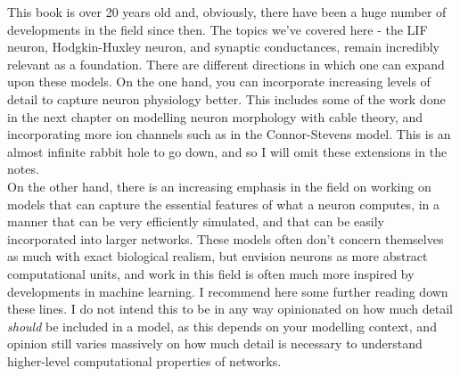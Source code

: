 \documentclass{article}
\begin{document}
This book is over 20 years old and, obviously, there have been a huge number of developments in the field since then. The topics we've covered here - the LIF neuron, Hodgkin-Huxley neuron, and synaptic conductances, remain incredibly relevant as a foundation. There are different directions in which one can expand upon these models. On the one hand, you can incorporate increasing levels of detail to capture neuron physiology better. This includes some of the work done in the next chapter on modelling neuron morphology with cable theory, and incorporating more ion channels such as in the Connor-Stevens model. This is an almost infinite rabbit hole to go down, and so I will omit these extensions in the notes.\\

On the other hand, there is an increasing emphasis in the field on working on models that can capture the essential features of what a neuron computes, in a manner that can be very efficiently simulated, and that can be easily incorporated into larger networks. These models often don't concern themselves as much with exact biological realism, but envision neurons as more abstract computational units, and work in this field is often much more inspired by developments in machine learning. I recommend here some further reading down these lines. I do not intend this to be in any way opinionated on how much detail \emph{should} be included in a model, as this depends on your modelling context, and opinion still varies massively on how much detail is necessary to understand higher-level computational properties of networks.\\
\end{document}
